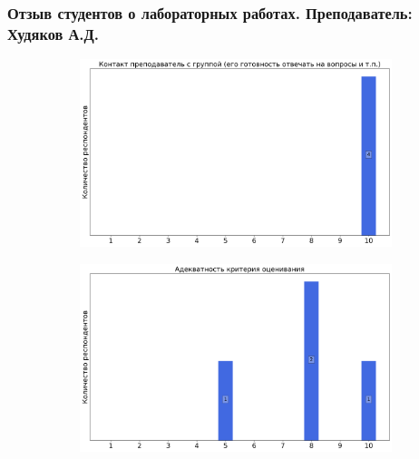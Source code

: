 	\subsubsection{Отзыв студентов о лабораторных работах. Преподаватель: Худяков А.Д.}
		\begin{figure}[H]
			\centering
			\begin{subfigure}[b]{0.45\textwidth}
				\centering
				\includegraphics[width=\textwidth]{images/2 course/Общая физика - электричество и магнетизм/labniks-marks-Худяков А.Д.-0.png}
			\end{subfigure}
			\begin{subfigure}[b]{0.45\textwidth}
				\centering
				\includegraphics[width=\textwidth]{images/2 course/Общая физика - электричество и магнетизм/labniks-marks-Худяков А.Д.-1.png}
			\end{subfigure}
			\begin{subfigure}[b]{0.45\textwidth}
				\centering

\end{subfigure}
\end{figure}
